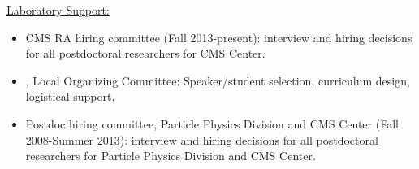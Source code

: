 \documentclass [12pt]{report}
\begin{document}
\noindent\underline{Laboratory Support:}

\begin{itemize}
\item{CMS RA hiring committee (Fall 2013-present):  interview and hiring decisions for all postdoctoral researchers for CMS Center.}		
\item{, Local Organizing Committee:  Speaker/student selection, curriculum design, logistical support. 
}
\item{Postdoc hiring committee, Particle Physics Division and CMS Center (Fall 2008-Summer 2013):  interview and hiring decisions for all postdoctoral researchers for Particle Physics Division and CMS Center.   
}
\end{itemize}

\clearpage
\newpage
\end{document}
